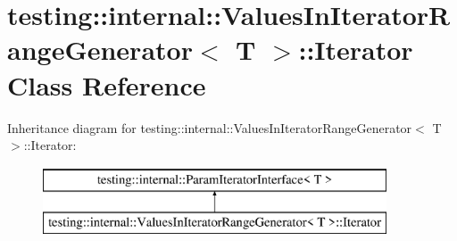 \hypertarget{classtesting_1_1internal_1_1_values_in_iterator_range_generator_1_1_iterator}{}\section{testing\+:\+:internal\+:\+:Values\+In\+Iterator\+Range\+Generator$<$ T $>$\+:\+:Iterator Class Reference}
\label{classtesting_1_1internal_1_1_values_in_iterator_range_generator_1_1_iterator}
Inheritance diagram for testing\+:\+:internal\+:\+:Values\+In\+Iterator\+Range\+Generator$<$ T $>$\+:\+:Iterator\+:\begin{figure}[H]
\begin{center}
\leavevmode
\includegraphics[height=2.000000cm]{classtesting_1_1internal_1_1_values_in_iterator_range_generator_1_1_iterator}
\end{center}
\end{figure}
